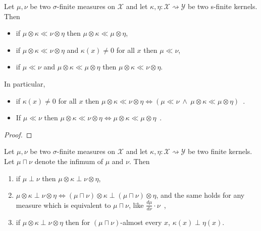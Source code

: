 \begin{lemma}
  \label{lem:ac_compProd_iff}
  \mathlibok
  Let $\mu, \nu$ be two $\sigma$-finite measures on $\mathcal X$ and let $\kappa, \eta : \mathcal X \rightsquigarrow \mathcal Y$ be two s-finite kernels. Then
  \begin{itemize}
    \item[(1a)] if $\mu \otimes \kappa \ll \nu \otimes \eta$ then $\mu \otimes \kappa \ll \mu \otimes \eta$,
    \item[(1b)] if $\mu \otimes \kappa \ll \nu \otimes \eta$ and $\kappa(x) \ne 0$ for all $x$ then $\mu \ll \nu$,
    \item[(2)]  if $\mu \ll \nu$ and $\mu \otimes \kappa \ll \mu \otimes \eta$ then $\mu \otimes \kappa \ll \nu \otimes \eta$.
  \end{itemize}
  In particular,
  \begin{itemize}
    \item if $\kappa(x) \ne 0$ for all $x$ then
      $\mu \otimes \kappa \ll \nu \otimes \eta \iff \left( \mu \ll \nu \ \wedge \ \mu \otimes \kappa \ll \mu \otimes \eta \right)$~.
    \item If $\mu \ll \nu$ then $\mu \otimes \kappa \ll \nu \otimes \eta \iff \mu \otimes \kappa \ll \mu \otimes \eta$~.
  \end{itemize}
  
\end{lemma}

\begin{proof}\mathlibok
{}

\end{proof}


\begin{lemma}
  \label{lem:mutuallySingular_compProd}
  \mathlibok
  Let $\mu, \nu$ be two $\sigma$-finite measures on $\mathcal X$ and let $\kappa, \eta : \mathcal X \rightsquigarrow \mathcal Y$ be two finite kernels.
  Let $\mu \sqcap \nu$ denote the infimum of $\mu$ and $\nu$.
  Then
  \begin{enumerate}
    \item if $\mu \perp \nu$ then $\mu \otimes \kappa \perp \nu \otimes \eta$,
    \item $\mu \otimes \kappa \perp \nu \otimes \eta \iff (\mu \sqcap \nu) \otimes \kappa \perp (\mu \sqcap \nu) \otimes \eta$, and the same holds for any measure which is equivalent to $\mu \sqcap \nu$, like $\frac{d \mu}{d \nu} \cdot \nu$~,
    \item if $\mu \otimes \kappa \perp \nu \otimes \eta$ then for $(\mu \sqcap \nu)$-almost every $x$, $\kappa(x) \perp \eta(x)$.
  \end{enumerate}
\end{lemma}

